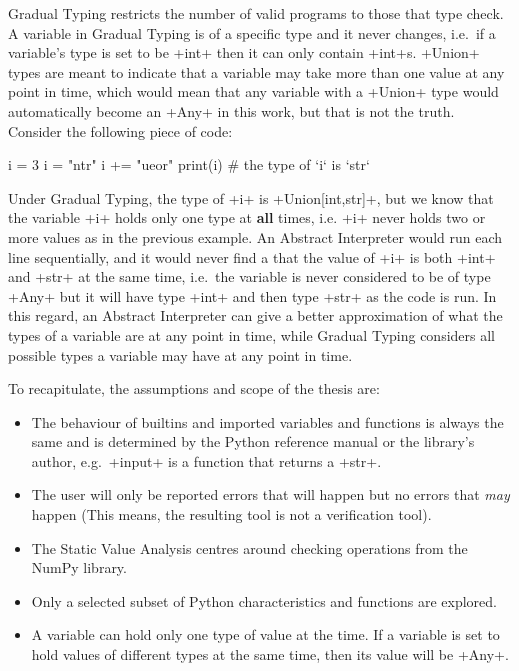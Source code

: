 Gradual Typing restricts the number of valid programs to those that type
check. A variable in Gradual Typing is of a specific type and it never
changes, i.e.~if a variable's type is set to be \pycode+int+ then it can
only contain \pycode+int+s. \pycode+Union+ types are meant to indicate
that a variable may take more than one value at any point in time, which
would mean that any variable with a \pycode+Union+ type would
automatically become an \pycode+Any+ in this work, but that is not the
truth. Consider the following piece of code:

\begin{pythoncode}
i = 3
i = "ntr"
i += "ueor"
print(i)  # the type of `i` is `str`
\end{pythoncode}

Under Gradual Typing, the type of \pycode+i+ is
\pycode+Union[int,str]+, but we know that the variable \pycode+i+
holds only one type at \textbf{all} times, i.e. \pycode+i+ never holds
two or more values as in the previous example. An Abstract Interpreter
would run each line sequentially, and it would never find a that the
value of \pycode+i+ is both \pycode+int+ and \pycode+str+ at the same
time, i.e.~the variable is never considered to be of type \pycode+Any+
but it will have type \pycode+int+ and then type \pycode+str+ as the
code is run. In this regard, an Abstract Interpreter can give a better
approximation of what the types of a variable are at any point in time,
while Gradual Typing considers all possible types a variable may have at
any point in time.

To recapitulate, the assumptions and scope of the thesis are:

\begin{itemize}
\tightlist
\item
  The behaviour of builtins and imported variables and functions is
  always the same and is determined by the Python reference manual or
  the library's author, e.g.~\pycode+input+ is a function that returns
  a \pycode+str+.
\item
  The user will only be reported errors that will happen but no errors
  that \emph{may} happen (This means, the resulting tool is not a
  verification tool).
\item
  The Static Value Analysis centres around checking operations from the
  NumPy library.
\item
  Only a selected subset of Python characteristics and functions are
  explored.
\item
  A variable can hold only one type of value at the time. If a variable
  is set to hold values of different types at the same time, then its
  value will be \pycode+Any+.
\end{itemize}

